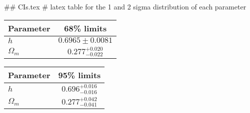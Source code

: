 ## CIs.tex
# latex table for the 1 and 2 sigma distribution of each parameter

\begin{tabular} { l  c}
 Parameter &  68\% limits\\
\hline
{\boldmath$h              $} & $0.6965\pm 0.0081          $\\
{\boldmath$\Omega_m       $} & $0.277^{+0.020}_{-0.022}   $\\
\hline
\end{tabular}

\begin{tabular} { l  c}
 Parameter &  95\% limits\\
\hline
{\boldmath$h              $} & $0.696^{+0.016}_{-0.016}   $\\
{\boldmath$\Omega_m       $} & $0.277^{+0.042}_{-0.041}   $\\
\hline
\end{tabular}

